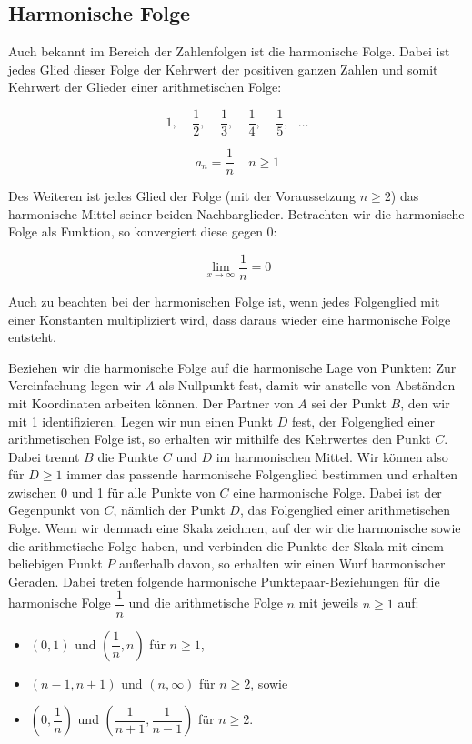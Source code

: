 \documentclass[12pt,a4paper]{article}
\begin{document}
\newpage
\subsection{Harmonische Folge}
\label{subsec:harmFolge}

Auch bekannt im Bereich der Zahlenfolgen ist die harmonische Folge. Dabei ist jedes Glied dieser Folge der Kehrwert der positiven ganzen Zahlen und somit Kehrwert der Glieder einer arithmetischen Folge: 

\[ 1,~~~~~\dfrac{1}{2},~~~~~\dfrac{1}{3},~~~~~\dfrac{1}{4},~~~~~\dfrac{1}{5},~~~\dots\]

\[ a_n = \dfrac{1}{n} ~~~~~ n \geq 1\]

Des Weiteren ist jedes Glied der Folge (mit der Voraussetzung $n \geq 2$) das harmonische Mittel seiner beiden Nachbarglieder. Betrachten wir die harmonische Folge als Funktion, so konvergiert diese gegen 0:

\[ \lim_{x \to \infty} \dfrac{1}{n} = 0\]

Auch zu beachten bei der harmonischen Folge ist, wenn jedes Folgenglied mit einer Konstanten multipliziert wird, dass daraus wieder eine harmonische Folge entsteht.

Beziehen wir die harmonische Folge auf die harmonische Lage von Punkten: Zur Vereinfachung legen wir $A$ als Nullpunkt fest, damit wir anstelle von Abständen mit Koordinaten arbeiten können. Der Partner von $A$ sei der Punkt $B$, den wir mit 1 identifizieren. Legen wir nun einen Punkt $D$ fest, der Folgenglied einer arithmetischen Folge ist, so erhalten wir mithilfe des Kehrwertes den Punkt $C$. Dabei trennt $B$ die Punkte $C$ und $D$ im harmonischen Mittel. Wir können also für $D \geq 1$ immer das passende harmonische Folgenglied bestimmen und erhalten zwischen 0 und 1 für alle Punkte von $C$ eine harmonische Folge. Dabei ist der Gegenpunkt von $C$, nämlich der Punkt $D$, das Folgenglied einer arithmetischen Folge. Wenn wir demnach eine Skala zeichnen, auf der wir die harmonische sowie die arithmetische Folge haben, und verbinden die Punkte der Skala mit einem beliebigen Punkt $P$ außerhalb davon, so erhalten wir einen Wurf harmonischer Geraden. Dabei treten folgende harmonische Punktepaar-Beziehungen für die harmonische Folge $\dfrac{1}{n}$ und die arithmetische Folge $n$ mit jeweils $n \geq 1$ auf:

\begin{itemize}
\item $\left(0, 1\right)$ und $\left(\dfrac{1}{n}, n\right)$ für $n \geq 1$,
\item $\left(n-1, n+1\right)$ und $\left(n, \infty\right)$ für $n \geq 2$, sowie
\item $\left(0, \dfrac{1}{n}\right)$ und $\left(\dfrac{1}{n+1}, \dfrac{1}{n-1}\right)$ für $n \geq 2$.
\end{itemize}
\end{document}

